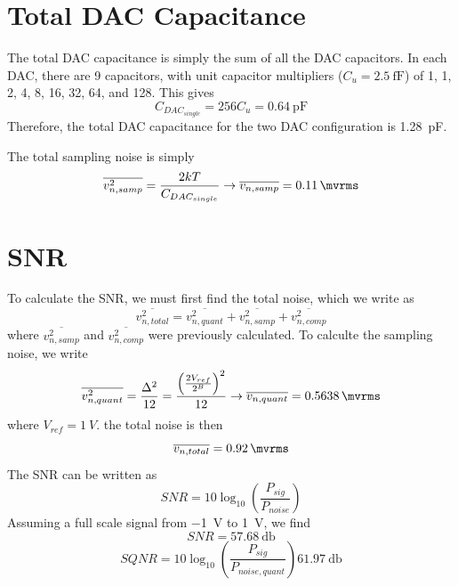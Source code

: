 \documentclass[letterpaper, notitlepage]{revtex4-1}
\begin{document}
\section{Total DAC Capacitance}
The total DAC capacitance is simply the sum of all the DAC capacitors. In each DAC, there are 9 capacitors, with unit capacitor multipliers ($C_u=\SI{2.5}{\femto\farad}$) of 1, 1, 2, 4, 8, 16, 32, 64, and 128. This gives
\begin{equation}
C_{DAC_{single}}=256C_u=\SI{0.64}{\pico\farad}
\end{equation}
Therefore, the total DAC capacitance for the two DAC configuration is \SI{1.28}{\pico\farad}.

The total sampling noise is simply
\begin{equation}
\overline{v_{n,samp}^2}=\frac{2kT}{C_{DAC_{single}}}\rightarrow\overline{v_{n,samp}}=\SI{0.11}{\mvrms}
\end{equation}


\section{SNR}
To calculate the SNR, we must first find the total noise, which we write as
\begin{equation}
\overline{v_{n,total}^2}=\overline{v_{n,quant}^2}+\overline{v_{n,samp}^2}+\overline{v_{n,comp}^2}
\end{equation}
where $\overline{v_{n,samp}^2}$ and $\overline{v_{n,comp}^2}$ were previously calculated. To calculte the sampling noise, we write
\begin{equation}
\overline{v_{n,quant}^2}=\frac{\Delta^2}{12}=\frac{\left(\frac{2V_{ref}}{2^B}\right)^2}{12}\rightarrow\overline{v_{n,quant}}=\SI{0.5638}{\mvrms}
\end{equation}
where $V_{ref}=\SI{1}{V}$. the total noise is then
\begin{equation}
\overline{v_{n,total}}=\SI{0.92}{\mvrms}
\end{equation}
The SNR can be written as
\begin{equation}
SNR=10\log_{10}\left(\frac{P_{sig}}{P_{noise}}\right)
\end{equation}
Assuming a full scale signal from \SI{-1}{\volt} to \SI{1}{\volt}, we find
\begin{equation}
SNR=\SI{57.68}{\decibel}
\end{equation}
\begin{equation}
SQNR=10\log_{10}\left(\frac{P_{sig}}{P_{noise,quant}}\right)\SI{61.97}{\decibel}
\end{equation}
\end{document}
